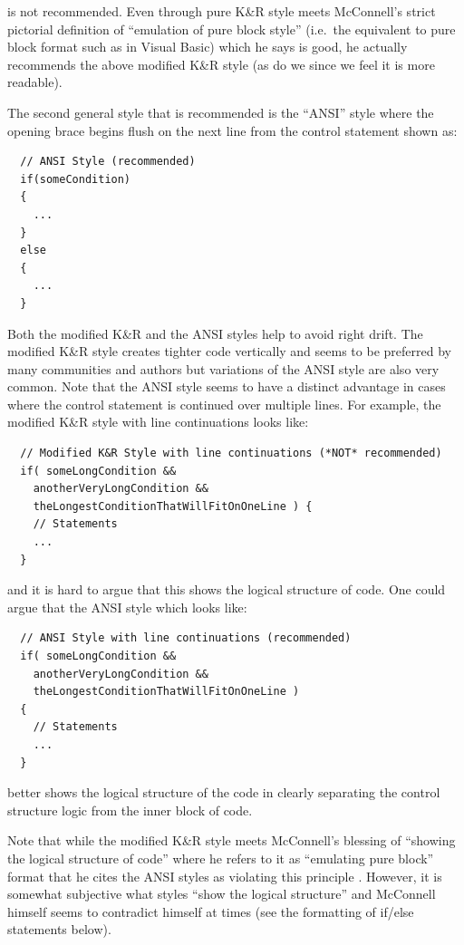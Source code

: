 \begin{itemize}
is not recommended.  Even through pure K\&R style meets McConnell's strict
pictorial definition of ``emulation of pure block style'' (i.e.\ the
equivalent to pure block format such as in Visual Basic) which he says is
good, he actually recommends the above modified K\&R style (as do we since we
feel it is more readable).

The second general style that is recommended is the ``ANSI''
style{}\cite{ArtisticStyle} where the opening brace begins flush on the next
line from the control statement shown as:

{\small\begin{verbatim}
  // ANSI Style (recommended)
  if(someCondition)
  {
    ...
  }
  else
  {
    ...
  }
\end{verbatim}}

Both the modified K\&R and the ANSI styles help to avoid right drift.  The
modified K\&R style creates tighter code vertically and seems to be preferred
by many communities and authors but variations of the ANSI style are also very
common.  Note that the ANSI style seems to have a distinct advantage in cases
where the control statement is continued over multiple lines.  For example,
the modified K\&R style with line continuations looks like:

{\small\begin{verbatim}
  // Modified K&R Style with line continuations (*NOT* recommended)
  if( someLongCondition &&
    anotherVeryLongCondition &&
    theLongestConditionThatWillFitOnOneLine ) {
    // Statements
    ...
  }
\end{verbatim}}

{}\noindent{}and it is hard to argue that this shows the logical structure of
code.  One could argue that the ANSI style which looks like:

{\small\begin{verbatim}
  // ANSI Style with line continuations (recommended)
  if( someLongCondition &&
    anotherVeryLongCondition &&
    theLongestConditionThatWillFitOnOneLine )
  {
    // Statements
    ...
  }
\end{verbatim}}

better shows the logical structure of the code in clearly separating the
control structure logic from the inner block of code.

Note that while the modified K\&R style meets McConnell's blessing of
``showing the logical structure of code'' where he refers to it as ``emulating
pure block'' format that he cites the ANSI styles as violating this principle
{}\cite[Section 31.1]{CodeComplete2nd04}.  However, it is somewhat subjective
what styles ``show the logical structure'' and McConnell himself seems to
contradict himself at times (see the formatting of if/else statements below).


\end{itemize}
